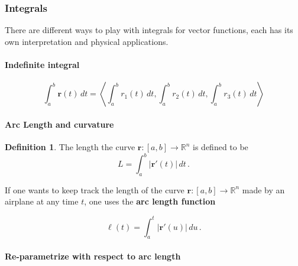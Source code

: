 \documentclass[
]{article}
\theoremstyle{definition}
\newtheorem{definition}{Definition}[section]
\theoremstyle{definition}
\theoremstyle{definition}
\theoremstyle{definition}
\theoremstyle{remark}
\begin{document}
\hypertarget{integrals}{%
\subsubsection{Integrals}\label{integrals}}

There are different ways to play with integrals for vector functions,
each has its own interpretation and physical applications.

\hypertarget{indefinite-integral}{%
\paragraph{Indefinite integral}\label{indefinite-integral}}

\begin{equation*}
    \int_a^b \mathbf{r}(t) \, dt = \left\langle \int_a^b r_1(t) \, dt, \int_a^b r_2(t) \, dt, \int_a^b r_3(t) \, dt \right\rangle
\end{equation*}

\hypertarget{arc-length-and-curvature}{%
\paragraph{Arc Length and curvature}\label{arc-length-and-curvature}}

\begin{definition}
The length the curve \(\mathbf{r}:[a,b] \to \mathbb{R}^n\) is defined to be
\begin{equation*}
L = \int_a^b \left| \mathbf{r}'(t) \right| \, dt \,.
\end{equation*}
\end{definition}

If one wants to keep track the length of the curve \(\mathbf{r}:[a,b] \to \mathbb{R}^n\) made by an airplane
at any time \(t\), one uses the \textbf{arc length function}

\begin{equation*}
    \ell(t) = \int_a^t \left| \mathbf{r}'(u) \right| \, du \,.
\end{equation*}

\hypertarget{re-parametrize-with-respect-to-arc-length}{%
\paragraph*{Re-parametrize with respect to arc length}\label{re-parametrize-with-respect-to-arc-length}}
\end{document}

